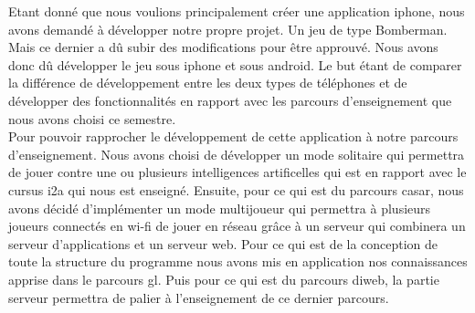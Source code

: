
 Etant donné que nous voulions principalement créer une application
 \gls{iphone}, nous avons demandé à développer notre propre projet. Un jeu de
 type Bomberman. Mais ce dernier a dû subir des modifications pour être
 approuvé. Nous avons donc dû développer le jeu sous \gls{iphone} et sous
 \gls{android}. Le but étant de comparer la différence de développement entre
 les deux types de téléphones et de développer des fonctionnalités en rapport
 avec les parcours d'enseignement que nous avons choisi ce semestre.\\
	
	
Pour pouvoir rapprocher le développement de cette application à notre parcours
d'enseignement. Nous avons choisi de développer un mode solitaire qui permettra
de jouer contre une ou plusieurs intelligences artificelles qui est en rapport
avec le cursus \gls{i2a} qui nous est enseigné. Ensuite, pour ce qui est du
parcours \gls{casar}, nous avons décidé d'implémenter un mode multijoueur qui
permettra à plusieurs joueurs connectés en \gls{wi-fi} de jouer en réseau grâce
à un serveur qui combinera un serveur d'applications et un serveur web. Pour ce qui est de la conception de toute la structure du programme nous avons mis en application nos connaissances apprise dans le parcours \gls{gl}. Puis pour ce qui est du parcours \gls{diweb}, la partie serveur permettra de palier à
l'enseignement de ce dernier parcours. 
	
